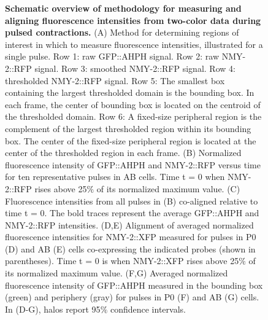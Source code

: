 \begin{figure}[!htbp]
\caption[Schematic overview of methodology for measuring and aligning fluorescence intensities from two-color data during pulsed contractions.]{ \label{fig:2212} \textbf{Schematic overview of methodology for measuring and aligning fluorescence intensities from two-color data during pulsed contractions.} (A) Method for determining regions of interest in which to measure fluorescence intensities, illustrated for a single pulse.  Row 1:  raw GFP::AHPH signal. Row 2: raw NMY-2::RFP signal.  Row 3: smoothed NMY-2::RFP signal. Row 4: thresholded NMY-2::RFP signal. Row 5: The smallest box containing the largest thresholded domain is the bounding box.  In each frame, the center of bounding box is located on the centroid of the thresholded domain. Row 6: A fixed-size peripheral region is the complement of the largest thresholded region within its bounding box.      The center of the fixed-size peripheral region is located at the center of the thresholded region in each frame.  (B) Normalized fluorescence intensity of GFP::AHPH and NMY-2::RFP versus time for ten representative pulses in AB cells. Time t = 0 when NMY-2::RFP rises above 25$\%$ of its normalized maximum value. (C) Fluorescence intensities from all pulses in (B) co-aligned relative to time t = 0. The bold traces represent the average GFP::AHPH and NMY-2::RFP intensities. (D,E) Alignment of averaged normalized fluorescence intensities for NMY-2::XFP measured for pulses in P0 (D) and AB (E) cells co-expressing the indicated probes (shown in parentheses). Time t = 0 is when NMY-2::XFP rises above 25$\%$ of its normalized maximum value. (F,G) Averaged normalized fluorescence intensity of GFP::AHPH measured in the bounding box (green) and periphery (gray) for pulses in P0 (F) and AB (G) cells.  In (D-G), halos report 95$\%$ confidence intervals.}
\end{figure}
















